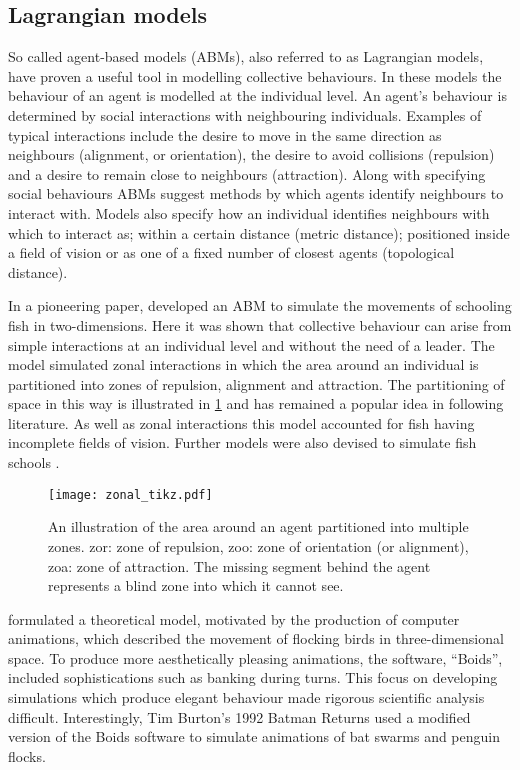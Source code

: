 \subsection{Lagrangian models}
\label{ssec:lagrangian_models}

So called agent-based models (ABMs), also referred to as Lagrangian models, have proven a useful tool in modelling collective behaviours. In these models the behaviour of an agent is modelled at the individual level. An agent's behaviour is determined by social interactions with neighbouring individuals. Examples of typical interactions include the desire to move in the same direction as neighbours (alignment, or orientation), the desire to avoid collisions (repulsion) and a desire to remain close to neighbours (attraction). Along with specifying social behaviours ABMs suggest methods by which agents identify neighbours to interact with. Models also specify how an individual identifies neighbours with which to interact as; within a certain distance (metric distance); positioned inside a field of vision or as one of a fixed number of closest agents (topological distance).

In a pioneering paper, \citet{aoki82} developed an ABM to simulate the movements of schooling fish in two-dimensions. Here it was shown that collective behaviour can arise from simple interactions at an individual level and without the need of a leader. The model simulated zonal interactions in which the area around an individual is partitioned into zones of repulsion, alignment and attraction. The partitioning of space in this way is illustrated in \cref{fig:zone_illustration} and has remained a popular idea in following literature. As well as zonal interactions this model accounted for fish having incomplete fields of vision. Further models were also devised to simulate fish schools \citep{okubo86, huth92}.

\begin{figure}[!htbp]
	\texttt{[image: zonal\_tikz.pdf]}
	\caption{An illustration of the area around an agent partitioned into multiple zones. zor: zone of repulsion, zoo: zone of orientation (or alignment), zoa: zone of attraction. The missing segment behind the agent represents a blind zone into which it cannot see.}
	\label{fig:zone_illustration}
\end{figure}

\citet{reynolds87} formulated a theoretical model, motivated by the production of computer animations, which described the movement of flocking birds in three-dimensional space. To produce more aesthetically pleasing animations, the software, ``Boids'', included sophistications such as banking during turns. This focus on developing simulations which produce elegant behaviour made rigorous scientific analysis difficult. Interestingly, Tim Burton's 1992 Batman Returns used a modified version of the Boids software to simulate animations of bat swarms and penguin flocks.

